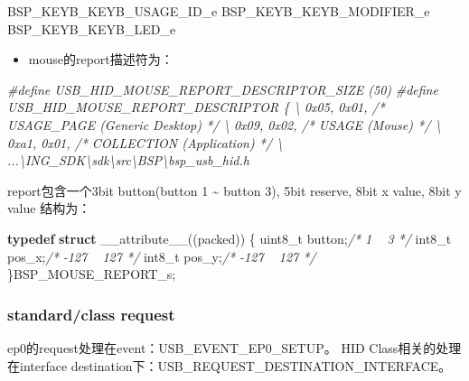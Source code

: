 \documentclass[
  12pt,
]{book}
\newenvironment{Shaded}{\begin{snugshade}}{\end{snugshade}}
\newcommand{\CommentTok}[1]{\textcolor[rgb]{0.56,0.35,0.01}{\textit{#1}}}
\newcommand{\DataTypeTok}[1]{\textcolor[rgb]{0.13,0.29,0.53}{#1}}
\newcommand{\KeywordTok}[1]{\textcolor[rgb]{0.13,0.29,0.53}{\textbf{#1}}}
\newcommand{\NormalTok}[1]{#1}
\newcommand{\PreprocessorTok}[1]{\textcolor[rgb]{0.56,0.35,0.01}{\textit{#1}}}
\providecommand{\tightlist}{%
  \setlength{\itemsep}{0pt}\setlength{\parskip}{0pt}}
\begin{document}
\begin{Shaded}
\begin{Highlighting}[]
\NormalTok{BSP_KEYB_KEYB_USAGE_ID_e}
\NormalTok{BSP_KEYB_KEYB_MODIFIER_e}
\NormalTok{BSP_KEYB_KEYB_LED_e}
\end{Highlighting}
\end{Shaded}

\begin{itemize}
\tightlist
\item
  mouse的report描述符为：
\end{itemize}

\begin{Shaded}
\begin{Highlighting}[]
\PreprocessorTok{#define USB_HID_MOUSE_REPORT_DESCRIPTOR_SIZE (50)}
\PreprocessorTok{#define USB_HID_MOUSE_REPORT_DESCRIPTOR \{ \textbackslash{}}
\PreprocessorTok{    0x05, 0x01, /* USAGE_PAGE (Generic Desktop)       */   \textbackslash{}}
\PreprocessorTok{    0x09, 0x02, /* USAGE (Mouse)                      */   \textbackslash{}}
\PreprocessorTok{    0xa1, 0x01, /* COLLECTION (Application)           */   \textbackslash{}}
\PreprocessorTok{    ...\textbackslash{}ING_SDK\textbackslash{}sdk\textbackslash{}src\textbackslash{}BSP\textbackslash{}bsp_usb_hid.h}
\end{Highlighting}
\end{Shaded}

report包含一个3bit button(button 1 \textasciitilde{} button 3), 5bit reserve, 8bit x value, 8bit y value 结构为：

\begin{Shaded}
\begin{Highlighting}[]
\KeywordTok{typedef} \KeywordTok{struct}\NormalTok{ __attribute__((packed))}
\NormalTok{\{}
  \DataTypeTok{uint8_t}\NormalTok{ button;}\CommentTok{/* 1 ~ 3 */}
  \DataTypeTok{int8_t}\NormalTok{ pos_x;}\CommentTok{/* -127 ~ 127 */}
  \DataTypeTok{int8_t}\NormalTok{ pos_y;}\CommentTok{/* -127 ~ 127 */}
\NormalTok{\}BSP_MOUSE_REPORT_s;}
\end{Highlighting}
\end{Shaded}

\hypertarget{standardclass-request}{%
\subsubsection{standard/class request}\label{standardclass-request}}

ep0的request处理在event：USB\_EVENT\_EP0\_SETUP。 HID Class相关的处理在interface destination下：USB\_REQUEST\_DESTINATION\_INTERFACE。
\end{document}
